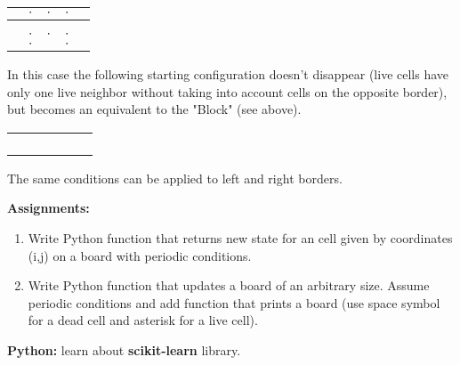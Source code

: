\begin{center}
\begin{tabular}{c|c|c|c|c}
\hline
 & $\cdot$ & $\cdot$ & $\cdot$ & \\
\hline
 & & & & \\
 & & & & \\
\hline
 & $\cdot$ & $\cdot$ & $\cdot$ & \\
\hline
 & $\cdot$ & \cellcolor{black} & $\cdot$ & \\
\hline
\end{tabular}
\end{center}

In this case the following starting configuration doesn't disappear
(live cells have only one live neighbor without taking into account
cells on the opposite border), but becomes an equivalent to the "Block"
(see above).

\begin{center}
\begin{tabular}{c|c|c|c|c|c}
\hline
 & & \cellcolor{black} & \cellcolor{black} & & \\
\hline
 & & & & & \\
\hline
 & & & & & \\
\hline
 & & & & & \\
\hline
 & & \cellcolor{black} & \cellcolor{black} & & \\ 
\hline
\end{tabular}
\end{center}

The same conditions can be applied to left and right borders.

\begin{tcolorbox}
\textbf{Assignments:}
\begin{enumerate}
\item Write Python function that returns new state for an cell
given by coordinates (i,j) on a board with periodic conditions.
\item Write Python function that updates a board of an arbitrary
size. Assume periodic conditions and add function that prints
a board (use space symbol for a dead cell and asterisk for a live cell).
\end{enumerate}
\end{tcolorbox}












\begin{tcolorbox}
\textbf{Python:} learn about \textbf{scikit-learn} library.
\end{tcolorbox}




